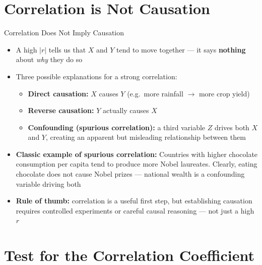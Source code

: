 \documentclass[12pt, aspectratio=169]{beamer}
\begin{document}
    \section{Correlation is Not Causation}


    \begin{frame}{Correlation Does Not Imply Causation}
        \begin{itemize}
            \item A high $|r|$ tells us that $X$ and $Y$ tend to move together
                --- it says \textbf{nothing} about \emph{why} they do so
            \item Three possible explanations for a strong correlation:
            \begin{itemize}
                \item \textbf{Direct causation:} $X$ causes $Y$
                    (e.g.\ more rainfall $\to$ more crop yield)
                \item \textbf{Reverse causation:} $Y$ actually causes $X$
                \item \textbf{Confounding (spurious correlation):} a third
                    variable $Z$ drives both $X$ and $Y$, creating an apparent
                    but misleading relationship between them
            \end{itemize}
            \item \textbf{Classic example of spurious correlation:}
                Countries with higher chocolate consumption per capita tend to
                produce more Nobel laureates.
                Clearly, eating chocolate does not cause Nobel prizes ---
                national wealth is a confounding variable driving both
            \item \textbf{Rule of thumb:} correlation is a useful first step,
                but establishing causation requires controlled experiments or
                careful causal reasoning --- not just a high $r$
        \end{itemize}
    \end{frame}


    \section{Test for the Correlation Coefficient}
\end{document}
